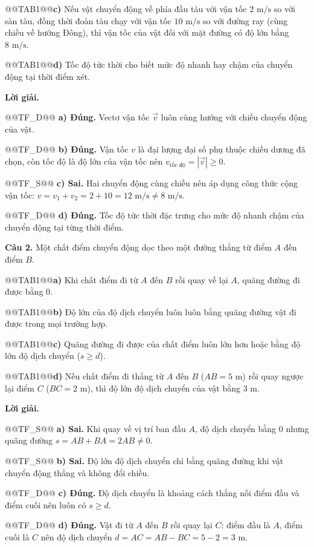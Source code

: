 \documentclass{article}
\begin{document}
@@TAB1@@\textbf{c)} Nếu vật chuyển động về phía đầu tàu với vận tốc $2\text{ m/s}$ so với sàn tàu, đồng thời đoàn tàu chạy với vận tốc $10\text{ m/s}$ so với đường ray (cùng chiều về hướng Đông), thì vận tốc của vật đối với mặt đường có độ lớn bằng $8\text{ m/s}$.

@@TAB1@@\textbf{d)} Tốc độ tức thời cho biết mức độ nhanh hay chậm của chuyển động tại thời điểm xét.

\textbf{Lời giải.}

@@TF_D@@ \textbf{a) Đúng.} Vectơ vận tốc $\vec{v}$ luôn cùng hướng với chiều chuyển động của vật.

@@TF_D@@ \textbf{b) Đúng.} Vận tốc $v$ là đại lượng đại số phụ thuộc chiều dương đã chọn, còn tốc độ là độ lớn của vận tốc nên $v_{\text{tốc độ}} = |\vec{v}| \ge 0$.

@@TF_S@@ \textbf{c) Sai.} Hai chuyển động cùng chiều nên áp dụng công thức cộng vận tốc: $v = v_1 + v_2 = 2 + 10 = 12\text{ m/s} \ne 8\text{ m/s}$.

@@TF_D@@ \textbf{d) Đúng.} Tốc độ tức thời đặc trưng cho mức độ nhanh chậm của chuyển động tại từng thời điểm.

\textbf{Câu 2.} Một chất điểm chuyển động dọc theo một đường thẳng từ điểm $A$ đến điểm $B$.

@@TAB1@@\textbf{a)} Khi chất điểm đi từ $A$ đến $B$ rồi quay về lại $A$, quãng đường đi được bằng $0$.

@@TAB1@@\textbf{b)} Độ lớn của độ dịch chuyển luôn luôn bằng quãng đường vật đi được trong mọi trường hợp.

@@TAB1@@\textbf{c)} Quãng đường đi được của chất điểm luôn lớn hơn hoặc bằng độ lớn độ dịch chuyển ($s \ge d$).

@@TAB1@@\textbf{d)} Nếu chất điểm đi thẳng từ $A$ đến $B$ ($AB = 5\text{ m}$) rồi quay ngược lại điểm $C$ ($BC = 2\text{ m}$), thì độ lớn độ dịch chuyển của vật bằng $3\text{ m}$.

\textbf{Lời giải.}

@@TF_S@@ \textbf{a) Sai.} Khi quay về vị trí ban đầu $A$, độ dịch chuyển bằng $0$ nhưng quãng đường $s = AB + BA = 2AB \ne 0$.

@@TF_S@@ \textbf{b) Sai.} Độ lớn độ dịch chuyển chỉ bằng quãng đường khi vật chuyển động thẳng và không đổi chiều.

@@TF_D@@ \textbf{c) Đúng.} Độ dịch chuyển là khoảng cách thẳng nối điểm đầu và điểm cuối nên luôn có $s \ge d$.

@@TF_D@@ \textbf{d) Đúng.} Vật đi từ $A$ đến $B$ rồi quay lại $C$: điểm đầu là $A$, điểm cuối là $C$ nên độ dịch chuyển $d = AC = AB - BC = 5 - 2 = 3\text{ m}$.
\end{document}
